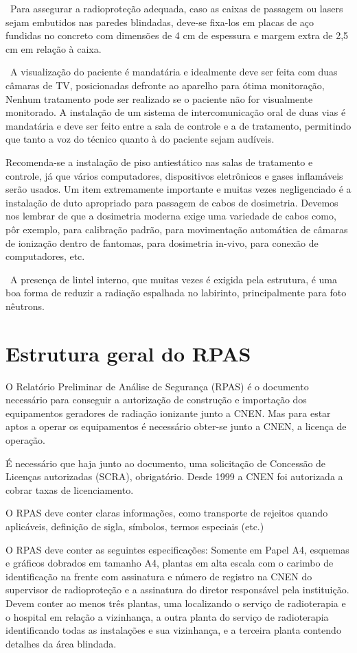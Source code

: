 \documentclass[
	12pt,				%
    oneside,			%
	a4paper,			%
	english,			%
	french,				%
	spanish,			%
	brazil,				%
	]{abntex2}
\begin{document}
 Para assegurar a radioproteção adequada, caso as caixas de passagem ou lasers sejam embutidos nas paredes blindadas, deve-se fixa-los em placas de aço fundidas no concreto com dimensões de 4 cm de espessura e margem extra de 2,5 cm em relação à caixa. 

 A visualização do paciente é mandatária e idealmente deve ser feita com duas câmaras de TV, posicionadas defronte ao aparelho para ótima monitoração, Nenhum tratamento pode ser realizado se o paciente não for visualmente monitorado. A instalação de um sistema de intercomunicação oral de duas vias é mandatária e deve ser feito entre a sala de controle e a de tratamento, permitindo que tanto a voz do técnico quanto à do paciente sejam audíveis. 

Recomenda-se a instalação de piso antiestático nas salas de tratamento e controle, já que vários computadores, dispositivos eletrônicos e gases inflamáveis serão usados. Um item extremamente importante e muitas vezes negligenciado é a instalação de duto apropriado para passagem de cabos de dosimetria. Devemos nos lembrar de que a dosimetria moderna exige uma variedade de cabos como, pôr exemplo, para calibração padrão, para movimentação automática de câmaras de ionização dentro de fantomas, para dosimetria in-vivo, para conexão de computadores, etc. 

 A presença de lintel interno, que muitas vezes é exigida pela estrutura, é uma boa forma de reduzir a radiação espalhada no labirinto, principalmente para foto nêutrons. 


\chapter{Estrutura geral do RPAS}

O Relatório Preliminar de Análise de Segurança (RPAS) é o documento necessário para conseguir a autorização de construção e importação dos equipamentos geradores de radiação ionizante junto a CNEN. Mas para estar aptos a operar os equipamentos é necessário obter-se junto a CNEN, a licença de operação. 

É necessário que haja junto ao documento, uma solicitação de Concessão de Licenças autorizadas (SCRA), obrigatório. Desde 1999 a CNEN foi autorizada a cobrar taxas de licenciamento. 

O RPAS deve conter claras informações, como transporte de rejeitos quando aplicáveis, definição de sigla, símbolos, termos especiais (etc.) 

O RPAS deve conter as seguintes especificações: Somente em Papel A4, esquemas e gráficos dobrados em tamanho A4, plantas em alta escala com o carimbo de identificação na frente com assinatura e número de registro na CNEN do supervisor de radioproteção e a assinatura do diretor responsável pela instituição. Devem conter ao menos três plantas, uma localizando o serviço de radioterapia e o hospital em relação a vizinhança, a outra planta do serviço de radioterapia identificando todas as instalações e sua vizinhança, e a terceira planta contendo detalhes da área blindada. 
\end{document}

